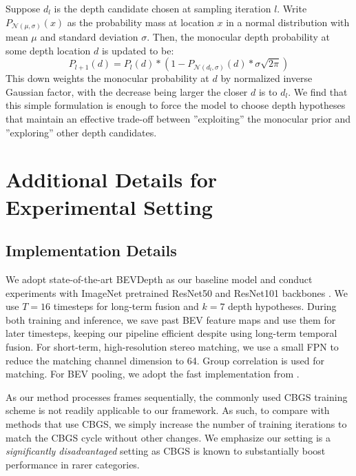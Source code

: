 \documentclass[runningheads, hyperfootnotes=false]{article}
\begin{document}
Suppose $d_l$ is the depth candidate chosen at sampling iteration $l$. Write $P_{\mathcal{N}(\mu, \sigma)}(x)$ as the probability mass at location $x$ in a normal distribution with mean $\mu$ and standard deviation $\sigma$. Then, the monocular depth probability at some depth location $d$ is updated to be:
\begin{equation}\label{eq:gauss}
    P_{l+1}(d) = P_l(d) * (1 - P_{\mathcal{N}(d_l, \sigma)}(d) * \sigma \sqrt{2\pi})
\end{equation}
This down weights the monocular probability at $d$ by normalized inverse Gaussian factor, with the decrease being larger the closer $d$ is to $d_l$. We find that this simple formulation is enough to force the model to choose depth hypotheses that maintain an effective trade-off between ''exploiting'' the monocular prior and ''exploring'' other depth candidates. \section{Additional Details for Experimental Setting}\label{app:exp}
\subsection{Implementation Details}
We adopt state-of-the-art BEVDepth \citep{li2022bevdepth} as our baseline model and conduct experiments with ImageNet pretrained ResNet50 and ResNet101 backbones \citep{He2016DeepRL}. We use $T = 16$ timesteps for long-term fusion and $k = 7$ depth hypotheses. During both training and inference, we save past BEV feature maps and use them for later timesteps, keeping our pipeline efficient despite using long-term temporal fusion. For short-term, high-resolution stereo matching, we use a small FPN to reduce the matching channel dimension to 64. Group correlation \citep{Guo2019GroupWiseCS} is used for matching. For BEV pooling, we adopt the fast implementation from \citep{Liu2022BEVFusionMM}.

As our method processes frames sequentially, the commonly used CBGS \citep{Zhu2019ClassbalancedGA} training scheme is not readily applicable to our framework. As such, to compare with methods that use CBGS, we simply increase the number of training iterations to match the CBGS cycle without other changes. We emphasize our setting is a \textit{significantly disadvantaged} setting as CBGS is known to substantially boost performance in rarer categories.   
\end{document}
